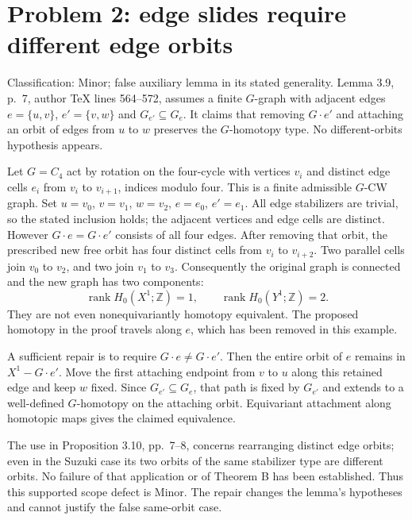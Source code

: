 \documentclass[10pt]{article}
\begin{document}
\section*{Problem 2: edge slides require different edge orbits}
Classification: Minor; false auxiliary lemma in its stated generality. Lemma 3.9, p. 7, author TeX lines 564–572, assumes a finite \(G\)-graph with adjacent edges \(e=\{u,v\}\), \(e'=\{v,w\}\) and \(G_{e'}\subseteq G_e\). It claims that removing \(G\cdot e'\) and attaching an orbit of edges from \(u\) to \(w\) preserves the \(G\)-homotopy type. No different-orbits hypothesis appears.\par
Let \(G=C_4\) act by rotation on the four-cycle with vertices \(v_i\) and distinct edge cells \(e_i\) from \(v_i\) to \(v_{i+1}\), indices modulo four. This is a finite admissible \(G\)-CW graph. Set \(u=v_0\), \(v=v_1\), \(w=v_2\), \(e=e_0\), \(e'=e_1\). All edge stabilizers are trivial, so the stated inclusion holds; the adjacent vertices and edge cells are distinct. However \(G\cdot e=G\cdot e'\) consists of all four edges. After removing that orbit, the prescribed new free orbit has four distinct cells from \(v_i\) to \(v_{i+2}\). Two parallel cells join \(v_0\) to \(v_2\), and two join \(v_1\) to \(v_3\). Consequently the original graph is connected and the new graph has two components: \[\operatorname{rank}H_0(X^1;\mathbb Z)=1,\qquad
 \operatorname{rank}H_0(Y^1;\mathbb Z)=2.\] They are not even nonequivariantly homotopy equivalent. The proposed homotopy in the proof travels along \(e\), which has been removed in this example.\par
A sufficient repair is to require \(G\cdot e\ne G\cdot e'\). Then the entire orbit of \(e\) remains in \(X^1-G\cdot e'\). Move the first attaching endpoint from \(v\) to \(u\) along this retained edge and keep \(w\) fixed. Since \(G_{e'}\subseteq G_e\), that path is fixed by \(G_{e'}\) and extends to a well-defined \(G\)-homotopy on the attaching orbit. Equivariant attachment along homotopic maps gives the claimed equivalence.\par
The use in Proposition 3.10, pp. 7–8, concerns rearranging distinct edge orbits; even in the Suzuki case its two orbits of the same stabilizer type are different orbits. No failure of that application or of Theorem B has been established. Thus this supported scope defect is Minor. The repair changes the lemma’s hypotheses and cannot justify the false same-orbit case.\par
\end{document}
